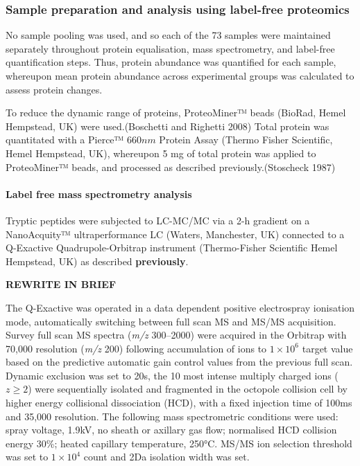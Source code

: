\documentclass[9pt,lineno]{elife}
\begin{document}
\hypertarget{label-free-sample-prep}{%
\subsubsection{Sample preparation and analysis using label-free proteomics}\label{label-free-sample-prep}}

No sample pooling was used, and so each of the 73 samples were maintained separately throughout protein equalisation, mass spectrometry, and label-free quantification steps.
Thus, protein abundance was quantified for each sample, whereupon mean protein abundance across experimental groups was calculated to assess protein changes.

To reduce the dynamic range of proteins, ProteoMiner™ beads (BioRad, Hemel Hempstead, UK) were used.(Boschetti and Righetti 2008) Total protein was quantitated with a Pierce™ \(660 nm\) Protein Assay (Thermo Fisher Scientific, Hemel Hempstead, UK), whereupon 5 mg of total protein was applied to ProteoMiner™ beads, and processed as described previously.(Stoscheck 1987)

\hypertarget{label-free-mass-spectrometry-analysis}{%
\paragraph{Label free mass spectrometry analysis}\label{label-free-mass-spectrometry-analysis}}

Tryptic peptides were subjected to LC-MC/MC via a 2-h gradient on a NanoAcquity™ ultraperformance LC (Waters, Manchester, UK) connected to a Q-Exactive Quadrupole-Orbitrap instrument (Thermo-Fisher Scientific Hemel Hempstead, UK) as described \textbf{previously}.

\textbf{REWRITE IN BRIEF}

The Q-Exactive was operated in a data dependent positive electrospray ionisation mode, automatically switching between full scan MS and MS/MS acquisition.
Survey full scan MS spectra (\emph{m/z} 300--2000) were acquired in the Orbitrap with 70,000 resolution (\emph{m/z} 200) following accumulation of ions to \(1\times 10^6\) target value based on the predictive automatic gain control values from the previous full scan.
Dynamic exclusion was set to 20s, the 10 most intense multiply charged ions (\(z \geq 2\)) were sequentially isolated and fragmented in the octopole collision cell by higher energy collisional dissociation (HCD), with a fixed injection time of 100ms and 35,000 resolution.
The following mass spectrometric conditions were used: spray voltage, 1.9kV, no sheath or axillary gas flow; normalised HCD collision energy 30\%; heated capillary temperature, 250°C.
MS/MS ion selection threshold was set to \(1\times 10^4\) count and 2Da isolation width was set.
\end{document}
